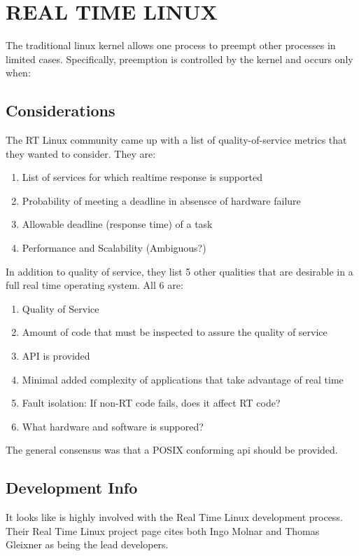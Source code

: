 \documentclass{article}
\begin{document}
\section{REAL TIME LINUX}
The traditional linux kernel allows one process to preempt other processes in limited cases.  Specifically, preemption is controlled by the kernel and occurs only when:

\subsection{Considerations}
The RT Linux community came up with a list of quality-of-service metrics that they wanted to consider. \cite{RTLSummaryPost}  They are:
\begin{enumerate}
\item List of services for which realtime response is supported
\item Probability of meeting a deadline in absensce of hardware failure
\item Allowable deadline (response time) of a task
\item Performance and Scalability (Ambiguous?)
\end{enumerate}

In addition to quality of service, they list 5 other qualities that are desirable in a full real time operating system.  All 6 are:
\begin{enumerate}
\item Quality of Service
\item Amount of code that must be inspected to assure the quality of service
\item API is provided
\item Minimal added complexity of applications that take advantage of real time
\item Fault isolation: If non-RT code fails, does it affect RT code?
\item What hardware and software is suppored?
\end{enumerate}

The general consensus was that a POSIX conforming api should be provided.


\subsection{Development Info}
It looks like \cite{Osadl} is highly involved with the Real Time Linux development process.  Their Real Time Linux project page \cite{OsadlRealTimeLinux} cites both Ingo Molnar and Thomas Gleixner as being the lead developers.
\end{document}
